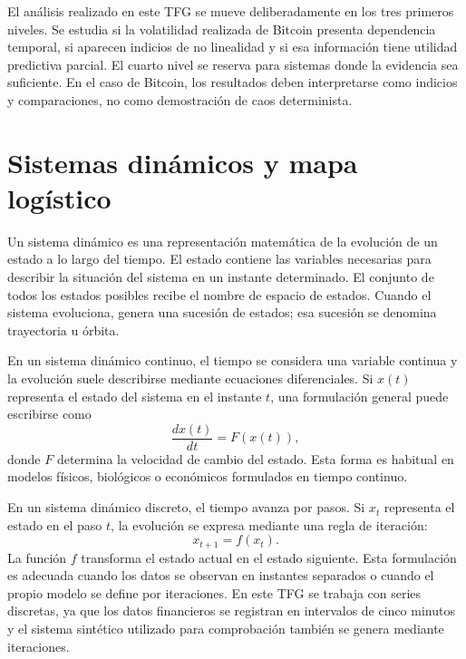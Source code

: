 El análisis realizado en este TFG se mueve deliberadamente en los tres primeros niveles. Se estudia si la volatilidad realizada de Bitcoin presenta dependencia temporal, si aparecen indicios de no linealidad y si esa información tiene utilidad predictiva parcial. El cuarto nivel se reserva para sistemas donde la evidencia sea suficiente. En el caso de Bitcoin, los resultados deben interpretarse como indicios y comparaciones, no como demostración de caos determinista.

\section{Sistemas dinámicos y mapa logístico}\label{sec:sistemas-dinamicos-logistico}

Un sistema dinámico es una representación matemática de la evolución de un estado a lo largo del tiempo. El estado contiene las variables necesarias para describir la situación del sistema en un instante determinado. El conjunto de todos los estados posibles recibe el nombre de espacio de estados. Cuando el sistema evoluciona, genera una sucesión de estados; esa sucesión se denomina trayectoria u órbita.

En un sistema dinámico continuo, el tiempo se considera una variable continua y la evolución suele describirse mediante ecuaciones diferenciales. Si \(x(t)\) representa el estado del sistema en el instante \(t\), una formulación general puede escribirse como
\begin{equation}
    \frac{dx(t)}{dt} = F(x(t)),
\end{equation}
donde \(F\) determina la velocidad de cambio del estado. Esta forma es habitual en modelos físicos, biológicos o económicos formulados en tiempo continuo.

En un sistema dinámico discreto, el tiempo avanza por pasos. Si \(x_t\) representa el estado en el paso \(t\), la evolución se expresa mediante una regla de iteración:
\begin{equation}
    x_{t+1} = f(x_t).
\end{equation}
La función \(f\) transforma el estado actual en el estado siguiente. Esta formulación es adecuada cuando los datos se observan en instantes separados o cuando el propio modelo se define por iteraciones. En este TFG se trabaja con series discretas, ya que los datos financieros se registran en intervalos de cinco minutos y el sistema sintético utilizado para comprobación también se genera mediante iteraciones.

